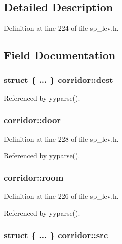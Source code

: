 \subsection{Detailed Description}


Definition at line 224 of file sp\+\_\+lev.\+h.



\subsection{Field Documentation}
\hypertarget{structcorridor_a5ffa6faa08a26c327a29f0ac3eaad1e1}{
\subsubsection[{dest}]{\setlength{\rightskip}{0pt plus 5cm}struct \{ ... \}   corridor\+::dest}}\label{structcorridor_a5ffa6faa08a26c327a29f0ac3eaad1e1}


Referenced by yyparse().

\hypertarget{structcorridor_a1940d9ead4d121f63d1d2f817c975680}{
\subsubsection[{door}]{ corridor\+::door}}\label{structcorridor_a1940d9ead4d121f63d1d2f817c975680}


Definition at line 228 of file sp\+\_\+lev.\+h.



Referenced by yyparse().

\hypertarget{structcorridor_af00114170dcd0889820aa58e1e7288a0}{
\subsubsection[{room}]{ corridor\+::room}}\label{structcorridor_af00114170dcd0889820aa58e1e7288a0}


Definition at line 226 of file sp\+\_\+lev.\+h.



Referenced by yyparse().

\hypertarget{structcorridor_acbdc58c6cb46b4ec6d65bd41c75e7f3f}{
\subsubsection[{src}]{\setlength{\rightskip}{0pt plus 5cm}struct \{ ... \}   corridor\+::src}}\label{structcorridor_acbdc58c6cb46b4ec6d65bd41c75e7f3f}


